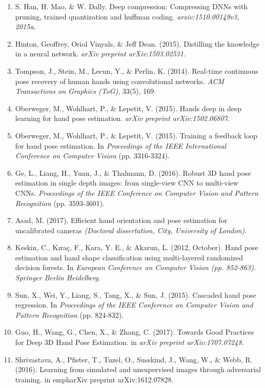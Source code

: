 \documentclass{article}
\begin{document}
\begin{enumerate}
\item S. Han, H. Mao, \& W. Dally. Deep compression: Compressing DNNs with pruning, trained
quantization and huffman coding. \emph{arxiv:1510.00149v3, 2015a}.
\item Hinton, Geoffrey, Oriol Vinyals, \& Jeff Dean.  (2015). Distilling the knowledge in a neural network. \emph{arXiv preprint arXiv:1503.02531}.
\item Tompson, J., Stein, M., Lecun, Y., \& Perlin, K. (2014). Real-time continuous pose recovery of human hands using convolutional networks. \emph{ACM Transactions on Graphics (ToG)}, 33(5), 169.
\item Oberweger, M., Wohlhart, P., \& Lepetit, V. (2015). Hands deep in deep learning for hand pose estimation. \emph{arXiv preprint arXiv:1502.06807}.
\item Oberweger, M., Wohlhart, P., \& Lepetit, V. (2015). Training a feedback loop for hand pose estimation. In \emph{Proceedings of the IEEE International Conference on Computer Vision} (pp. 3316-3324).
\item Ge, L., Liang, H., Yuan, J., \& Thalmann, D. (2016). Robust 3D hand pose estimation in single depth images: from single-view CNN to multi-view CNNs. \emph{Proceedings of the IEEE Conference on Computer Vision and Pattern Recognition} (pp. 3593-3601).
\item Asad, M. (2017). Efficient hand orientation and pose estimation for uncalibrated cameras \emph{(Doctoral dissertation, City, University of London)}.
\item Keskin, C., Kıraç, F., Kara, Y. E., \& Akarun, L. (2012, October). Hand pose estimation and hand shape classification using multi-layered randomized decision forests. In \emph{European Conference on Computer Vision (pp. 852-863). Springer Berlin Heidelberg}.
\item Sun, X., Wei, Y., Liang, S., Tang, X., \& Sun, J. (2015). Cascaded hand pose regression. In \emph{Proceedings of the IEEE Conference on Computer Vision and Pattern Recognition} (pp. 824-832).
\item Guo, H., Wang, G., Chen, X., \& Zhang, C. (2017). Towards Good Practices for Deep 3D Hand Pose Estimation. in \emph{arXiv preprint arXiv:1707.07248}.
\item Shrivastava, A., Pfister, T., Tuzel, O., Susskind, J., Wang, W., \& Webb, R. (2016). Learning from simulated and unsupervised images through adversarial training. in emph{arXiv preprint arXiv:1612.07828}.
\end{enumerate}
\end{document}
